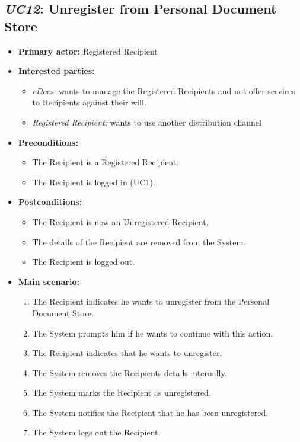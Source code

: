 \documentclass[a4paper,10pt]{article}
\begin{document}
\subsection{\emph{UC12}: Unregister from Personal Document Store}
\begin{itemize}
    \item \textbf{Primary actor:} Registered Recipient
    \item \textbf{Interested parties:} 
        \begin{itemize}
            \item \textit{eDocs:} wants to manage the Registered Recipients and not offer services to Recipients against their will.
            \item \textit{Registered Recipient:} wants to use another distribution channel
        \end{itemize}

    \item \textbf{Preconditions:}
        \begin{itemize}
            \item The Recipient is a Registered Recipient.
            \item The Recipient is logged in (UC1).
        \end{itemize}

    \item \textbf{Postconditions:}
        \begin{itemize}
            \item The Recipient is now an Unregistered Recipient.
            \item The details of the Recipient are removed from the System.
            \item The Recipient is logged out.
        \end{itemize}
        
    \item \textbf{Main scenario:} 
    \begin{enumerate}
       \item The Recipient indicates he wants to unregister from the Personal Document Store.
       \item The System prompts him if he wants to continue with this action.
       \item The Recipient indicates that he wants to unregister.
       \item The System removes the Recipients details internally.
       \item The System marks the Recipient as unregistered.
       \item The System notifies the Recipient that he has been unregistered.
       \item The System logs out the Recipient.
    \end{enumerate}


\end{itemize}
\end{document}

